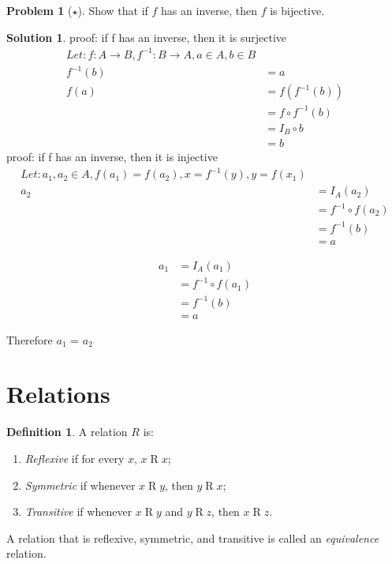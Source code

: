 \documentclass[10pt]{article}
\theoremstyle{definition}
\newtheorem{defn}{Definition}
\newtheorem{prob}{Problem}
\newtheorem{sol}{Solution}
\begin{document}
  \begin{prob}[$\star$]
    Show that if $f$ has an inverse, then $f$ is bijective.
  \end{prob}
  
  \begin{sol}
   proof: if f has an inverse, then it is surjective
   \begin{align}
   Let:  f: A \rightarrow B, f^{-1}: B \rightarrow A, a \in A, b \in B \\
   f^{-1}(b) &= a \\
   f(a) &= f(f^{-1}(b)) \\
       &= f \circ f^{-1} (b) \\
        &= I_B \circ b \\
        &= b   
   \end{align}
   proof: if f has an inverse, then it is injective
   \begin{align}
    Let: a_1, a_2 \in A, f(a_1) = f(a_2), x = f^{-1}(y), y = f(x_1) \\
    a_2 &= I_A(a_2) \\
        &= f^{-1} \circ f (a_2) \\
        &= f^{-1}(b) \\
        &= a
   \end{align}
   
   \begin{align}
   a_1 &= I_A(a_1) \\
        &= f^{-1} \circ f (a_1) \\
        &= f^{-1}(b) \\
        &= a
   \end{align}
   
   Therefore $a_1$ = $a_2$
  \end{sol}
  
  \section*{Relations}
  \newcommand\R{\mathrel{R}}
  
  
  \begin{defn}
    A relation $R$ is:
    \begin{enumerate}
    \item \emph{Reflexive} if for every $x$, $x \R x$;
    \item \emph{Symmetric} if whenever $x \R y$, then $y \R x$;
    \item \emph{Transitive} if whenever $x \R y$ and $y \R z$, then $x \R z$.
    \end{enumerate}
    A relation that is reflexive, symmetric, and transitive is called an \emph{equivalence} relation.
  \end{defn}
  
\end{document}
